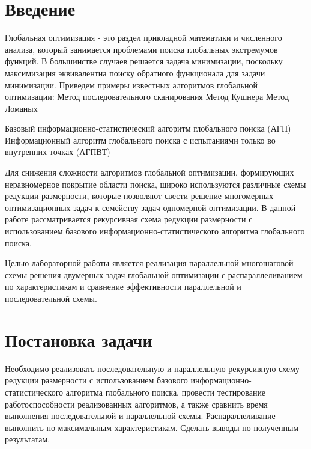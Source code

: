 \documentclass{report}
\begin{document}
\setcounter{page}{2}

\newpage

\section*{Введение}


Глобальная оптимизация - это раздел прикладной математики и численного анализа, который занимается проблемами поиска глобальных экстремумов функций. В большинстве случаев решается задача минимизации, поскольку максимизация эквивалентна поиску обратного функционала для задачи минимизации. Приведем примеры известных алгоритмов глобальной оптимизации:
Метод последовательного сканирования
Метод Кушнера
Метод Ломаных
\par
Базовый информационно-статистический алгоритм глобального поиска (АГП)
Информационный алгоритм глобального поиска с испытаниями только во внутренних точках (АГПВТ)
\par
Для снижения сложности алгоритмов глобальной оптимизации, формирующих неравномерное покрытие области поиска, широко используются различные схемы редукции размерности, которые позволяют свести решение многомерных оптимизационных задач к семейству задач одномерной оптимизации.
В данной работе рассматривается рекурсивная схема редукции размерности с использованием базового информационно-статистического алгоритма глобального поиска.
\par
Целью лабораторной работы является реализация параллельной многошаговой схемы решения двумерных задач глобальной оптимизации с распараллеливанием по характеристикам и сравнение эффективности параллельной и последовательной схемы.

\newpage

\section*{Постановка задачи}
Необходимо реализовать последовательную и параллельную рекурсивную схему редукции размерности с использованием базового информационно-статистического алгоритма глобального поиска, провести тестирование работоспособности реализованных алгоритмов, а также сравнить время выполнения последовательной и параллельной схемы. Распараллеливание выполнить по максимальным характеристикам. Сделать выводы по полученным результатам.
\newpage

\end{document}
